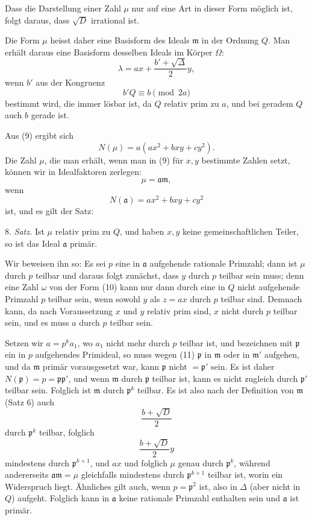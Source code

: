 \documentclass[11pt]{article}
\begin{document}
Dass die Darstellung einer Zahl $\mu$ nur auf eine Art in dieser Form möglich ist, folgt daraus, dass $\sqrt D$ irrational ist.

Die Form $\mu$ heisst daher eine Basisform des Ideals $\mathfrak m$ in der Ordnung $Q$. Man erhält daraus eine Basisform desselben Ideals im Körper $\Omega$:
\[
 \lambda=ax+\frac{b'+\sqrt\Delta}{2}y,
\]
wenn $b'$ aus der Kongruenz
\[
 b'Q\equiv b\pmod{2a}
\]
bestimmt wird, die immer lösbar ist, da $Q$ relativ prim zu $a$, und bei geradem $Q$ auch $b$ gerade ist.

Aus (9) ergibt sich
\begin{equation}
 N(\mu)=a(ax^2+bxy+cy^2).
\tag{12}
\end{equation}
Die Zahl $\mu$, die man erhält, wenn man in (9) für $x,y$ bestimmte Zahlen setzt, können wir in Idealfaktoren zerlegen:
\[
 \mu=\mathfrak a\mathfrak m,
\]
wenn
\begin{equation}
 N(\mathfrak a)=ax^2+bxy+cy^2
\tag{13}
\end{equation}
ist, und es gilt der Satz:

8. \emph{Satz.} Ist $\mu$ relativ prim zu $Q$, und haben $x,y$ keine gemeinschaftlichen Teiler, so ist das Ideal $\mathfrak a$ primär.

Wir beweisen ihn so: Es sei $p$ eine in $\mathfrak a$ aufgehende rationale Primzahl; dann ist $\mu$ durch $p$ teilbar und daraus folgt zunächst, dass $y$ durch $p$ teilbar sein muss; denn eine Zahl $\omega$ von der Form (10) kann nur dann durch eine in $Q$ nicht aufgehende Primzahl $p$ teilbar sein, wenn sowohl $y$ als $z=ax$ durch $p$ teilbar sind. Demnach kann, da nach Voraussetzung $x$ und $y$ relativ prim sind, $x$ nicht durch $p$ teilbar sein, und es muss $a$ durch $p$ teilbar sein.

Setzen wir $a=p^ka_1$, wo $a_1$ nicht mehr durch $p$ teilbar ist, und bezeichnen mit $\mathfrak p$ ein in $p$ aufgehendes Primideal, so muss wegen (11) $\mathfrak p$ in $\mathfrak m$ oder in $\mathfrak m'$ aufgehen, und da $\mathfrak m$ primär vorausgesetzt war, kann $\mathfrak p$ nicht $=\mathfrak p'$ sein. Es ist daher $N(\mathfrak p)=p=\mathfrak p\mathfrak p'$, und wenn $\mathfrak m$ durch $\mathfrak p$ teilbar ist, kann es nicht zugleich durch $\mathfrak p'$ teilbar sein. Folglich ist $\mathfrak m$ durch $\mathfrak p^k$ teilbar. Es ist also nach der Definition von $\mathfrak m$ (Satz 6) auch
\[
 \frac{b+\sqrt D}{2}
\]
durch $\mathfrak p^k$ teilbar, folglich
\[
 \frac{b+\sqrt D}{2}y
\]
mindestens durch $\mathfrak p^{k+1}$, und $ax$ und folglich $\mu$ genau durch $\mathfrak p^k$, während andererseits $\mathfrak a\mathfrak m=\mu$ gleichfalls mindestens durch $\mathfrak p^{k+1}$ teilbar ist, worin ein Widerspruch liegt. Ähnliches gilt auch, wenn $p=\mathfrak p^2$ ist, also in $\Delta$ (aber nicht in $Q$) aufgeht. Folglich kann in $\mathfrak a$ keine rationale Primzahl enthalten sein und $\mathfrak a$ ist primär.
\end{document}
